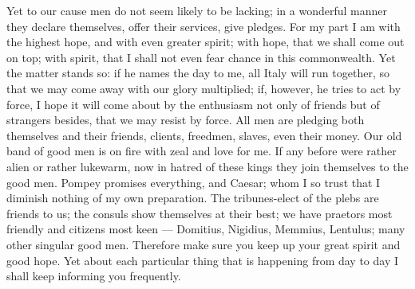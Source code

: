  Yet to our cause men do not seem likely to be lacking; in a wonderful manner they declare themselves, offer their services, give pledges. For my part I am with the highest hope, and with even greater spirit; with hope, that we shall come out on top; with spirit, that I shall not even fear chance in this commonwealth. Yet the matter stands so: if he names the day to me, all Italy will run together, so that we may come away with our glory multiplied; if, however, he tries to act by force, I hope it will come about by the enthusiasm not only of friends but of strangers besides, that we may resist by force. All men are pledging both themselves and their friends, clients, freedmen, slaves, even their money. Our old band of good men is on fire with zeal and love for me. If any before were rather alien or rather lukewarm, now in hatred of these kings they join themselves to the good men. Pompey promises everything, and Caesar; whom I so trust that I diminish nothing of my own preparation. The tribunes-elect of the plebs are friends to us; the consuls show themselves at their best; we have praetors most friendly and citizens most keen --- Domitius, Nigidius, Memmius, Lentulus; many other singular good men. Therefore make sure you keep up your great spirit and good hope. Yet about each particular thing that is happening from day to day I shall keep informing you frequently.
